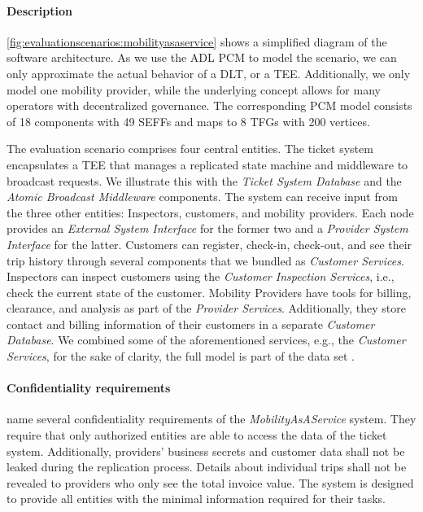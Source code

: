 \paragraph{Description}
\autoref{fig:evaluationscenarios:mobilityasaservice} shows a simplified diagram of the software architecture.
As we use the \ac{ADL} \ac{PCM} to model the scenario, we can only approximate the actual behavior of a \ac{DLT}, or a \ac{TEE}.
Additionally, we only model one mobility provider, while the underlying concept allows for many operators with decentralized governance. 
The corresponding \ac{PCM} model consists of 18 components with 49 \acp{SEFF} and maps to 8 \acp{TFG} with 200 vertices.

The evaluation scenario comprises four central entities.
The ticket system encapsulates a \ac{TEE} that manages a replicated state machine and middleware to broadcast requests.
We illustrate this with the \emph{Ticket System Database} and the \emph{Atomic Broadcast Middleware} components.
The system can receive input from the three other entities: Inspectors, customers, and mobility providers.
Each node provides an \emph{External System Interface} for the former two and a \emph{Provider System Interface} for the latter.
Customers can register, check-in, check-out, and see their trip history through several components that we bundled as \emph{Customer Services}.
Inspectors can inspect customers using the \emph{Customer Inspection Services}, i.e., check the current state of the customer.
Mobility Providers have tools for billing, clearance, and analysis as part of the \emph{Provider Services}.
Additionally, they store contact and billing information of their customers in a separate \emph{Customer Database}.
We combined some of the aforementioned services, e.g., the \emph{Customer Services}, for the sake of clarity, the full model is part of the data set \cite{dataset}.

\paragraph{Confidentiality requirements}
\textcite{leinweber_leveraging_2023} name several confidentiality requirements of the \emph{MobilityAsAService} system.
They require that only authorized entities are able to access the data of the ticket system.
Additionally, providers' business secrets and customer data shall not be leaked during the replication process.
Details about individual trips shall not be revealed to providers who only see the total invoice value.
The system is designed to provide all entities with the minimal information required for their tasks.

